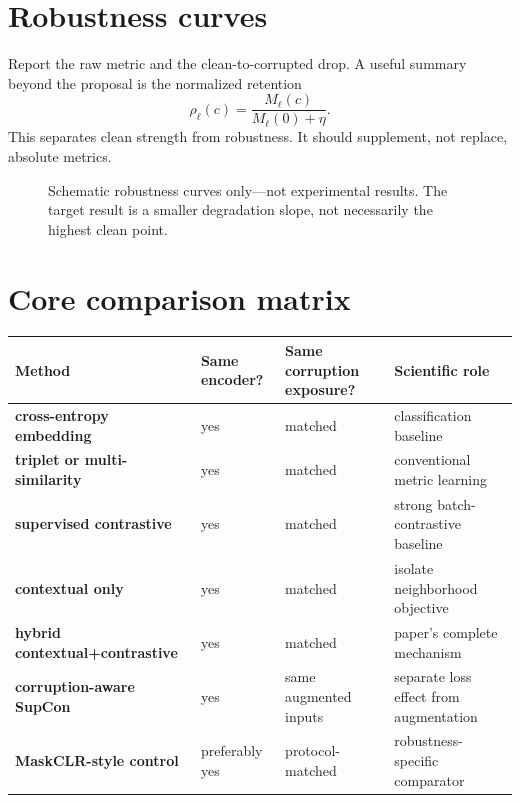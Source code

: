 \documentclass[11pt,oneside,openany]{book}
\theoremstyle{myplain}
\theoremstyle{definition}
\begin{document}
\section{Robustness curves}

Report the raw metric and the clean-to-corrupted drop. A useful summary beyond the proposal is the normalized retention
\begin{equation}
  \rho_\ell(c)=\frac{M_\ell(c)}{M_\ell(0)+\eta}.
  \label{eq:retention}
\end{equation}
This separates clean strength from robustness. It should supplement, not replace, absolute metrics.

\begin{figure}[H]
\centering
{}
\caption{Schematic robustness curves only---not experimental results. The target result is a smaller degradation slope, not necessarily the highest clean point.}
\label{fig:robustness-schematic}
\end{figure}

\section{Core comparison matrix}

\begin{center}
\begin{tabularx}{\textwidth}{>{\bfseries}l X X X}
\toprule
Method & Same encoder? & Same corruption exposure? & Scientific role \\
\midrule
cross-entropy embedding & yes & matched & classification baseline \\
triplet or multi-similarity & yes & matched & conventional metric learning \\
supervised contrastive & yes & matched & strong batch-contrastive baseline \\
contextual only & yes & matched & isolate neighborhood objective \\
hybrid contextual+contrastive & yes & matched & paper's complete mechanism \\
corruption-aware SupCon & yes & same augmented inputs & separate loss effect from augmentation \\
MaskCLR-style control & preferably yes & protocol-matched & robustness-specific comparator \\
\bottomrule
\end{tabularx}
\end{center}
\end{document}
